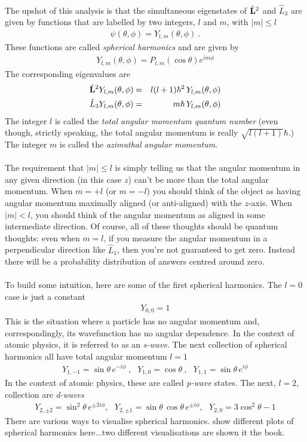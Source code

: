 \documentclass[12pt]{article}
\def\be{\begin{eqnarray}}
\def\ee{\end{eqnarray}}
\newcommand{\nn}{\nonumber}
\newcommand\para{\paragraph{}}
\newcommand{\co}{\color{olive}}
\newcommand{\cblue}{\color{blue}}
\begin{document}
{ \para
 {\co 
The upshot of this analysis is that the simultaneous eigenstates of $\hat{\bf L}^2$ and $\hat{L}_3$ are given by functions that are labelled by two integers, $l$ and $m$, with $|m|\leq l$
%
\be \psi(\theta,\phi) = Y_{l,m}(\theta,\phi)\ .\ee
%
These functions are called {\it spherical harmonics}  and are given by
%
\be Y_{l,m}(\theta,\phi) = P_{l,m}(\cos\theta)e^{im\phi}\nn\ee
%
The corresponding eigenvalues are 
%
\be \hat{\bf L}^2Y_{l,m}(\theta,\phi) &=& l(l+1)\hbar^2\,Y_{l,m}(\theta,\phi)\nn\\ \hat{L}_3 Y_{l,m}(\theta,\phi) &=&m\hbar \,Y_{l,m}(\theta,\phi)\nn\ee
%
The integer $l$ is called the {\it total angular momentum quantum number} (even though, strictly speaking, the total angular momentum is really $\sqrt{l(l+1)}\hbar$.) The integer $m$ is called the {\it azimuthal angular momentum}.
}





\para
The requirement that $|m|\leq l$ is simply telling us that the angular momentum in any given direction (in this case $z$) can't be more than the total angular momentum. When $m=+l$ (or $m=-l$) you should think of the object as having angular momentum maximally aligned (or anti-aligned) with the $z$-axis. When $|m|<l$, you should think of the angular momentum as aligned in some intermediate direction. Of course, all of these thoughts should be quantum thoughts: even when $m=l$, if you measure the angular momentum in a perpendicular direction like $\hat{L}_1$, then you're not guaranteed to get zero. Instead there will be a probability distribution of answers centred around zero.




\para
To build some intuition, here are some of the first spherical harmonics. {\co The $l=0$ case is just a constant
%
\be Y_{0,0} = 1\nn\ee
%
This is the situation where a particle has no angular momentum and, correspondingly, its wavefunction has no angular dependence. In the context of atomic physics, it is referred to as an {\it s-wave}. The next collection of spherical harmonics all have total angular momentum $l=1$
%
\be Y_{1,-1} = \sin\theta\, e^{-i\phi}\ ,\ \ \ Y_{1,0} = \cos\theta\  ,\ \ \ Y_{1,1} = \sin\theta \, e^{i\phi}\nn\ee
%
In the context of atomic physics, these are called {\it p-wave} states. The next, $l=2$, collection are {\it d-waves}
%
\be Y_{2,\pm 2} = \sin^2\theta \, e^{\pm 2i\phi}  ,\ \ \ Y_{2,\pm 1}  = \sin\theta\,\cos\theta\,e^{\pm i\phi}  ,\ \ \ Y_{2,0} = 3\cos^2\theta -1\nn\ee
%
}
There are various ways to visualise spherical harmonics. {\cblue show different plots of spherical harmonics here...two different visualisations are shown it the book.}


}
\end{document}
